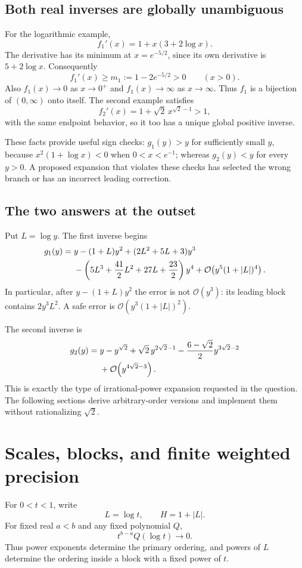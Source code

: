 \documentclass[11pt,a4paper]{article}
\numberwithin{equation}{section}
\theoremstyle{definition}\newtheorem{definition}[theorem]{Definition}
\theoremstyle{remark}\newtheorem{remark}[theorem]{Remark}
\newcommand{\OO}{\mathcal O}\newcommand{\Id}{\mathrm{id}}
\begin{document}
\subsection{Both real inverses are globally unambiguous}
For the logarithmic example,
\[
f_1'(x)=1+x(3+2\log x).
\]
The derivative has its minimum at $x=e^{-5/2}$, since its own derivative is $5+2\log x$. Consequently
\begin{equation}\label{eq:globalm}
f_1'(x)\ge m_1:=1-2e^{-5/2}>0\qquad(x>0).
\end{equation}
Also $f_1(x)\to0$ as $x\to0^+$ and $f_1(x)\to\infty$ as $x\to\infty$. Thus $f_1$ is a bijection of $(0,\infty)$ onto itself. The second example satisfies
\[
f_2'(x)=1+\sqrt2\,x^{\sqrt2-1}>1,
\]
with the same endpoint behavior, so it too has a unique global positive inverse.

These facts provide useful sign checks: $g_1(y)>y$ for sufficiently small $y$, because $x^2(1+\log x)<0$ when $0<x<e^{-1}$; whereas $g_2(y)<y$ for every $y>0$. A proposed expansion that violates these checks has selected the wrong branch or has an incorrect leading correction.

\subsection{The two answers at the outset}
Put $L=\log y$. The first inverse begins
\begin{align}\label{eq:logstart}
g_1(y)={}&y-(1+L)y^2+(2L^2+5L+3)y^3\\
&-\left(5L^3+\frac{41}{2}L^2+27L+\frac{23}{2}\right)y^4
 +\OO\!\left(y^5(1+|L|)^4\right).\notag
\end{align}
In particular, after $y-(1+L)y^2$ the error is not $\OO(y^3)$: its leading block contains $2y^3L^2$. A safe error is $\OO(y^3(1+|L|)^2)$.

The second inverse is
\begin{align}\label{eq:irrstart}
g_2(y)={}&y-y^{\sqrt2}+\sqrt2\,y^{2\sqrt2-1}
-\frac{6-\sqrt2}{2}y^{3\sqrt2-2}\\
&+\OO\!\left(y^{4\sqrt2-3}\right).\notag
\end{align}
This is exactly the type of irrational-power expansion requested in the question. The following sections derive arbitrary-order versions and implement them without rationalizing $\sqrt2$.

\section{Scales, blocks, and finite weighted precision}
\label{sec:scales}
For $0<t<1$, write
\[
L=\log t,\qquad H=1+|L|.
\]
For fixed real $a<b$ and any fixed polynomial $Q$,
\begin{equation}\label{eq:powerbeatslog}
t^{b-a}Q(\log t)\longrightarrow0.
\end{equation}
Thus power exponents determine the primary ordering, and powers of $L$ determine the ordering inside a block with a fixed power of $t$.
\end{document}
